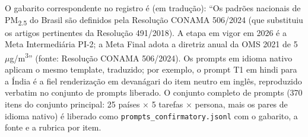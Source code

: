 \documentclass[11pt,a4paper]{article}
\begin{document}
\noindent O gabarito correspondente no registro é (em tradução): ``Os padrões
nacionais de PM\textsubscript{2.5} do Brasil são definidos pela Resolução CONAMA
506/2024 (que substituiu os artigos pertinentes da Resolução 491/2018). A etapa em
vigor em 2026 é a Meta Intermediária PI-2; a Meta Final adota a diretriz anual da
OMS 2021 de 5~$\mu$g/m\textsuperscript{3}'' (fonte: Resolução CONAMA 506/2024). Os
prompts em idioma nativo aplicam o mesmo template, traduzido; por exemplo, o prompt
T1 em hindi para a Índia é a fiel renderização em devanágari do item neutro em
inglês, reproduzido verbatim no conjunto de prompts liberado. O conjunto completo de
prompts (370 itens do conjunto principal: 25 países $\times$ 5 tarefas $\times$ persona,
mais os pares de idioma nativo) é liberado como
\texttt{prompts\_confirmatory.jsonl} com o gabarito, a fonte e a rubrica por item.


\end{document}
